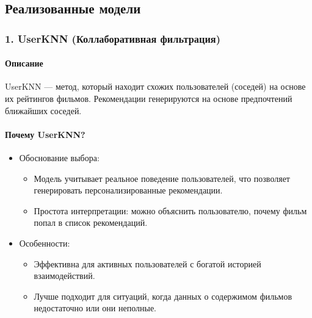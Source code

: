 \hypertarget{ux440ux435ux430ux43bux438ux437ux43eux432ux430ux43dux43dux44bux435-ux43cux43eux434ux435ux43bux438}{%
\subsection*{Реализованные
модели}\label{ux440ux435ux430ux43bux438ux437ux43eux432ux430ux43dux43dux44bux435-ux43cux43eux434ux435ux43bux438}}

\hypertarget{userknn-ux43aux43eux43bux43bux430ux431ux43eux440ux430ux442ux438ux432ux43dux430ux44f-ux444ux438ux43bux44cux442ux440ux430ux446ux438ux44f}{%
\subsubsection*{1. UserKNN (Коллаборативная
фильтрация)}\label{userknn-ux43aux43eux43bux43bux430ux431ux43eux440ux430ux442ux438ux432ux43dux430ux44f-ux444ux438ux43bux44cux442ux440ux430ux446ux438ux44f}}

\hypertarget{ux43eux43fux438ux441ux430ux43dux438ux435-1}{%
\paragraph{Описание}\label{ux43eux43fux438ux441ux430ux43dux438ux435-1}}

\leavevmode

UserKNN --- метод, который находит схожих пользователей (соседей) на
основе их рейтингов фильмов. Рекомендации генерируются на основе
предпочтений ближайших соседей.

\hypertarget{ux43fux43eux447ux435ux43cux443-userknn}{%
\paragraph{Почему
UserKNN?}\label{ux43fux43eux447ux435ux43cux443-userknn}}

\begin{itemize}
\tightlist
\item
  Обоснование выбора:

  \begin{itemize}
  \tightlist
  \item
    Модель учитывает реальное поведение пользователей, что позволяет
    генерировать персонализированные рекомендации.
  \item
    Простота интерпретации: можно объяснить пользователю, почему фильм
    попал в список рекомендаций.
  \end{itemize}
\item
  Особенности:

  \begin{itemize}
  \tightlist
  \item
    Эффективна для активных пользователей с богатой историей
    взаимодействий.
  \item
    Лучше подходит для ситуаций, когда данных о содержимом фильмов
    недостаточно или они неполные.
  \end{itemize}
\end{itemize}

